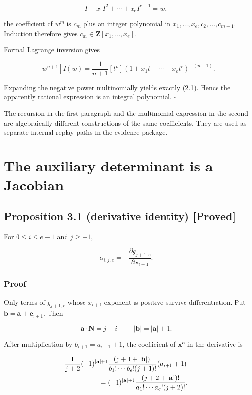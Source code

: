 \documentclass[
]{article}
\begin{document}
\[
I+x_1I^2+\cdots+x_eI^{e+1}=w,
\]

the coefficient of \(w^m\) is \(c_m\) plus an integer polynomial in
\(x_1,\ldots,x_e,c_2,\ldots,c_{m-1}\). Induction therefore gives
\(c_m\in\mathbf Z[x_1,\ldots,x_e]\).

Formal Lagrange inversion gives

\[
[w^{n+1}]I(w)=\frac1{n+1}[t^n]
(1+x_1t+\cdots+x_et^e)^{-(n+1)}.
\]

Expanding the negative power multinomially yields exactly (2.1). Hence
the apparently rational expression is an integral polynomial.
\(\square\)

The recursion in the first paragraph and the multinomial expression in
the second are algebraically different constructions of the same
coefficients. They are used as separate internal replay paths in the
evidence package.

\section{The auxiliary determinant is a
Jacobian}\label{the-auxiliary-determinant-is-a-jacobian}

\subsection*{Proposition 3.1 (derivative identity)
{[}Proved{]}}\label{proposition-3.1-derivative-identity-proved}

For \(0\le i\le e-1\) and \(j\ge-1\),

\[
\boxed{\alpha_{i,j,e}=-\frac{\partial g_{j+1,e}}{\partial x_{i+1}}.}
\tag{3.1}
\]

\subsubsection*{Proof}\label{proof-1}

Only terms of \(g_{j+1,e}\) whose \(x_{i+1}\) exponent is positive
survive differentiation. Put \(\mathbf b=\mathbf a+\mathbf e_{i+1}\).
Then

\[
\mathbf a\cdot\mathbf N=j-i,
\qquad
|\mathbf b|=|\mathbf a|+1.
\]

After multiplication by \(b_{i+1}=a_{i+1}+1\), the coefficient of
\(\mathbf x^{\mathbf a}\) in the derivative is

\[
\begin{aligned}
&\frac1{j+2}(-1)^{|\mathbf a|+1}
\frac{(j+1+|\mathbf b|)!}
{b_1!\cdots b_e!(j+1)!}(a_{i+1}+1)\\
&\hspace{18mm}=(-1)^{|\mathbf a|+1}
\frac{(j+2+|\mathbf a|)!}
{a_1!\cdots a_e!(j+2)!}.
\end{aligned}
\]
\end{document}
